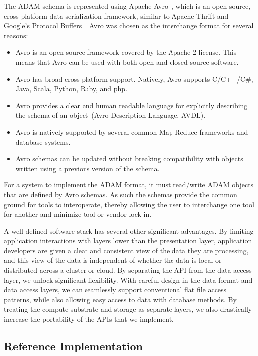 \documentclass{bioinfo}
\begin{document}
The ADAM schema is represented using Apache Avro~\citep{avro}, which is an open-source, cross-platform data serialization framework, similar
to Apache Thrift and Google's Protocol Buffers~\citep{thrift, protobuf}. Avro was chosen as the interchange format for several reasons:

\begin{itemize}
\item Avro is an open-source framework covered by the Apache 2 license. This means that Avro can be used with both open and closed source software.
\item Avro has broad cross-platform support. Natively, Avro supports C/C++/C\#, Java, Scala, Python, Ruby, and php.
\item Avro provides a clear and human readable language for explicitly describing the schema of an object~(Avro Description Language, AVDL).
\item Avro is natively supported by several common Map-Reduce frameworks and database systems.
\item Avro schemas can be updated without breaking compatibility with objects written using a previous version of the schema.
\end{itemize}

For a system to implement the ADAM format, it must read/write ADAM objects that are defined by Avro schemas. As such the schemas
provide the common ground for tools to interoperate, thereby allowing the user to interchange one tool for another and minimize
tool or vendor lock-in.

A well defined software stack has several other significant advantages. By limiting application interactions with layers lower than the presentation layer,
application developers are given a clear and consistent view of the data they are processing, and this view of the data is independent of whether the data
is local or distributed across a cluster or cloud. By separating the API from the data access layer, we unlock significant flexibility. With careful design in the data
format and data access layers, we can seamlessly support conventional flat file access patterns, while also allowing easy access to data with database methods.
By treating the compute substrate and storage as separate layers, we also drastically increase the portability of the APIs that we implement.

\subsection{Reference Implementation}
\label{sec:reference-implementation}
\end{document}
